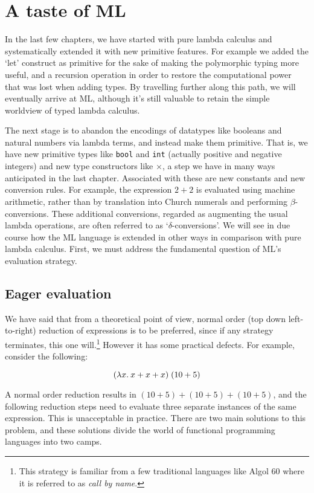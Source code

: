 \chapter{A taste of ML}

In the last few chapters, we have started with pure lambda calculus and
systematically extended it with new primitive features. For example we added
the `let' construct as primitive for the sake of making the polymorphic
typing more useful, and a recursion operation in order to restore the
computational power that was lost when adding types. By travelling further
along this path, we will eventually arrive at ML, although it's still valuable
to retain the simple worldview of typed lambda calculus.

The next stage is to abandon the encodings of datatypes like booleans and
natural numbers via lambda terms, and instead make them primitive. That is, we
have new primitive types like {\tt bool} and {\tt int} (actually positive and
negative integers) and new type constructors like $\times$, a step we have in
many ways anticipated in the last chapter. Associated with these are new
constants and new conversion rules. For example, the expression $2 + 2$ is
evaluated using machine arithmetic, rather than by translation into Church
numerals and performing $\beta$-conversions. These additional conversions,
regarded as augmenting the usual lambda operations, are often referred to as
`$\delta$-conversions'. We will see in due course how the ML language is
extended in other ways in comparison with pure lambda calculus. First, we must
address the fundamental question of ML's evaluation strategy.

\section{Eager evaluation}

We have said that from a theoretical point of view, normal order (top down
left-to-right) reduction of expressions is to be preferred, since if any
strategy terminates, this one will.\footnote{This strategy is familiar from a
few traditional languages like Algol 60 where it is referred to as {\em call by
name}.} However it has some practical defects. For example, consider the
following:

$$ (\lambda x.\: x + x + x)\; (10 + 5) $$

A normal order reduction results in $(10 + 5) + (10 + 5) + (10 + 5)$, and the
following reduction steps need to evaluate three separate instances of the same
expression. This is unacceptable in practice. There are two main solutions to
this problem, and these solutions divide the world of functional programming
languages into two camps.

